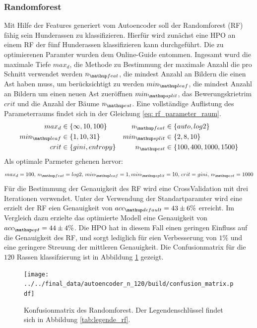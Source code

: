 \subsubsection{Randomforest}
Mit Hilfe der Features generiert vom Autoencoder soll der
Randomforest (RF) fähig sein Hunderassen zu klassifizieren.
Hierfür wird zunächst eine HPO an einem RF der fünf Hunderassen klassifizieren kann
durchgeführt. Die zu optimierenen Paramter
wurden dem Online-Guide \cite{RF_parameterraum} entommen. Ingesamt
wurd die maximale Tiefe $max_d$, die Methode zu Bestimmung der maximale Anzahl die pro Schnitt verwendet werden
$n\ua{feat}$, die mindest Anzahl an Bildern die einen Ast haben muss, um berücksichtigt zu werden
$min\ua{leaf}$, die mindest  Anzahl an Bildern um einen neuen Ast zueröffnen $min\ua{split}$,
das Bewerungskrietrim $crit$ und die Anzahl der Bäume $n\ua{est}$.
Eine vollständige Auflistung des Parameterraums findet sich in der Gleichung \eqref{eq: rf_parameter_raum}.
\begin{align}
  \begin{aligned}
    \label{eq: rf_parameter_raum}
    max_d &\in \left\{\infty, 10, 100\right\} & n\ua{feat}&\in\left\{auto, log2\right\}\\
    min\ua{leaf} &\in \left\{1, 10, 31\right\} & min\ua{split}&\in\left\{2, 8, 10\right\}\\
    crit &\in \left\{gini, entropy\right\} & n\ua{est}&\in\left\{100, 400, 1000, 1500 \right\}
  \end{aligned}
\end{align}
Als optimale Parmeter gehenen hervor:
\begin{equation*}
  max_d = 100,\, n\ua{feat}= log2, \, min\ua{leaf}= 1, min\ua{split}=10, \,   crit= gini, \, n\ua{est}=1000
\end{equation*}
Für die Bestimmung der Genauigkeit des RF wird eine CrossValidation mit
drei Iterationen verwendet. Unter der Verwendung der Standartparamter wird eine
erzielt der RF eien Genauigkeit von $acc\ua{default}=43\pm6\%$ erreicht.
Im Vergleich dazu erzielte das optimierte Modell eine Genauigkeit von $acc\ua{opt}=44\pm4\%$.
Die HPO hat in diesem Fall einen geringen Einfluss auf die Genauigkeit des RF,
und sorgt lediglich für eien Verbesserung von $1\%$ und eine geringere Streuung
der mittleren Genauigkeit.
Die Confusionmatrix für die $120$ Rassen klassifzierung ist in Abbildung
\ref{fig:Confusionmatrix_rf} gezeigt.
\begin{figure}
\centering
\texttt{[image: ../../final\_data/autoencoder\_n\_120/build/confusion\_matrix.pdf]}
\caption{Konfusionmatrix des Randomforest. Der Legendenschlüssel findet sich in
Abbildung \ref{tab:legende_rf}.}
\label{fig:Confusionmatrix_rf}
\end{figure}
